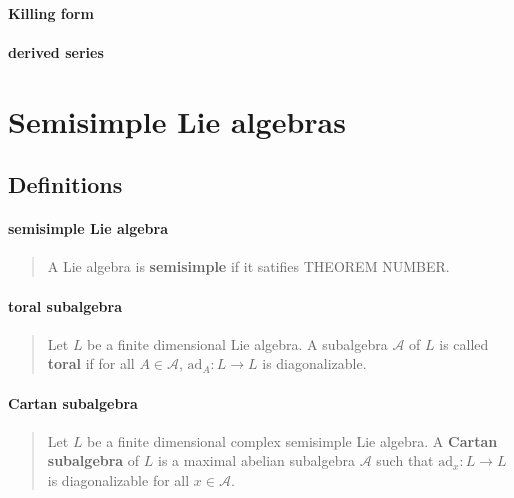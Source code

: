 \documentclass[letterpaper, 10pt]{article}
\theoremstyle{theostyle}
\begin{document}
\paragraph{Killing form}

\paragraph{derived series}
\begin{quote}

\end{quote}


\section{Semisimple Lie algebras}

\subsection{Definitions}

\paragraph{semisimple Lie algebra}
\begin{quote}
    A Lie algebra is \textbf{semisimple} if it satifies THEOREM NUMBER.
\end{quote}

\paragraph{toral subalgebra}
\begin{quote}
    Let \(L\) be a finite dimensional Lie algebra.
    A subalgebra \(\mathcal{A}\) of \(L\) is called \textbf{toral} if for all \(A \in \mathcal{A}\), \(\mathrm{ad}_A : L \rightarrow L\) is diagonalizable.
\end{quote}

\paragraph{Cartan subalgebra}
\begin{quote}
    Let \(L\) be a finite dimensional complex semisimple Lie algebra.
    A \textbf{Cartan subalgebra} of \(L\) is a maximal abelian subalgebra \(\mathcal{A}\) such that \(\mathrm{ad}_x : L \rightarrow L\) is diagonalizable for all \(x \in \mathcal{A}\).
\end{quote}
\end{document}
